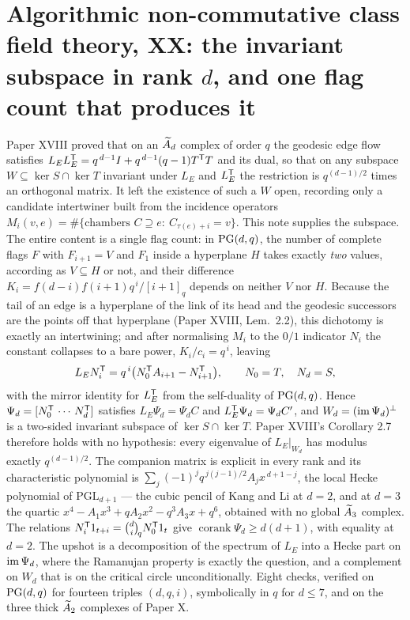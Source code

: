\renewcommand{\LE}{L_E}
\chapter[\texorpdfstring{XX. The invariant subspace in rank $d$, and one flag count that produces it}{XX. The invariant subspace in rank d, and one flag count that produces it}]{\texorpdfstring{Algorithmic non-commutative class field theory, XX: the invariant subspace in rank $d$, and one flag count that produces it}{Algorithmic non-commutative class field theory, XX: the invariant subspace in rank d, and one flag count that produces it}}\label{chap:XX}
\begin{chapterabstract}
\noindent
Paper XVIII proved that on an $\widetilde A_{d}$ complex of order $q$ the geodesic edge flow
satisfies $\LE\LE^{\tp}=q^{\,d-1}I+q^{\,d-1}(q-1)T^{\tp}T$ and its dual, so that on any
subspace $W\subseteq\ker S\cap\ker T$ invariant under $\LE$ and $\LE^{\tp}$ the restriction
is $q^{(d-1)/2}$ times an orthogonal matrix. It left the existence of such a $W$ open,
recording only a candidate intertwiner built from the incidence operators
$M_i(v,e)=\#\{\text{chambers } C\supseteq e:\ C_{\tau(e)+i}=v\}$. This note supplies the
subspace. The entire content is a single flag count: in $\mathrm{PG}(d,q)$, the number of complete
flags $F$ with $F_{i+1}=V$ and $F_1$ inside a hyperplane $H$ takes exactly \emph{two} values,
according as $V\subseteq H$ or not, and their difference
$K_i=f(d-i)f(i+1)q^{\,i}/[i+1]_q$ depends on neither $V$ nor $H$. Because the tail of an edge
is a hyperplane of the link of its head and the geodesic successors are the points off that
hyperplane (Paper XVIII, Lem.~2.2), this dichotomy is exactly an intertwining; and after
normalising $M_i$ to the $0/1$ indicator $N_i$ the constant collapses to a bare power,
$K_i/c_i=q^{\,i}$, leaving
\[
  \LE N_i^{\tp}=q^{\,i}\bigl(N_0^{\tp}A_{i+1}-N_{i+1}^{\tp}\bigr),
  \qquad N_0=T,\quad N_d=S,
\]
with the mirror identity for $\LE^{\tp}$ from the self-duality of $\mathrm{PG}(d,q)$. Hence
$\Psi_d=[N_0^{\mathsf{T}}\,\cdots\,N_d^{\mathsf{T}}]$ satisfies $\LE\Psi_d=\Psi_dC$ and
$\LE^{\tp}\Psi_d=\Psi_dC'$, and $W_d=(\operatorname{im}\Psi_d)^{\perp}$ is a two-sided invariant subspace
of $\ker S\cap\ker T$. Paper XVIII's Corollary 2.7 therefore holds with no hypothesis: every
eigenvalue of $\LE|_{W_d}$ has modulus exactly $q^{(d-1)/2}$. The companion matrix is
explicit in every rank and its characteristic polynomial is
$\sum_{j}(-1)^{j}q^{\,j(j-1)/2}A_jx^{\,d+1-j}$, the local Hecke polynomial of
$\mathrm{PGL}_{d+1}$ --- the cubic pencil of Kang and Li at $d=2$, and at $d=3$ the quartic
$x^4-A_1x^3+qA_2x^2-q^3A_3x+q^6$, obtained with no global $\widetilde A_{3}$ complex. The relations
$N_i^{\mathsf{T}}1_{t+i}=\binom{d}{i}_{\!q}N_0^{\mathsf{T}}1_t$ give $\operatorname{corank}\Psi_d\ge
d(d+1)$, with equality at $d=2$. The upshot is a decomposition of the spectrum of $\LE$ into
a Hecke part on $\operatorname{im}\Psi_d$, where the Ramanujan property is exactly the question, and a
complement on $W_d$ that is on the critical circle unconditionally. Eight checks, verified on
$\mathrm{PG}(d,q)$ for fourteen triples $(d,q,i)$, symbolically in $q$ for $d\le7$, and on the three
thick $\widetilde A_{2}$ complexes of Paper X.
\end{chapterabstract}

